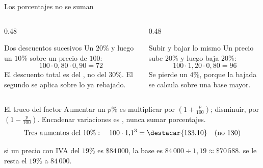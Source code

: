 \documentclass[aspectratio=169,10pt]{beamer}
\begin{document}
\begin{frame}{Los porcentajes no se suman}
  \scriptsize
  \begin{columns}[T,onlytextwidth]
    \begin{column}{0.48\textwidth}
      \begin{alertblock}{Dos descuentos sucesivos}
        \tiny
        Un $20\%$ y luego un $10\%$ sobre un precio de $100$:
        \[ 100\cdot 0{,}80\cdot 0{,}90 = 72 \]
        El descuento total es del , no del $30\%$.
        El segundo se aplica sobre lo ya rebajado.
      \end{alertblock}
    \end{column}
    \begin{column}{0.48\textwidth}
      \begin{alertblock}{Subir y bajar lo mismo}
        \tiny
        Un precio sube $20\%$ y luego baja $20\%$:
        \[ 100\cdot 1{,}20\cdot 0{,}80 = 96 \]
         Se pierde un $4\%$,
        porque la bajada se calcula sobre una base mayor.
      \end{alertblock}
    \end{column}
  \end{columns}

  \vspace{0.12cm}
  \begin{block}{El truco del factor}
    \tiny
    Aumentar un $p\%$ es multiplicar por $\left(1+\tfrac{p}{100}\right)$;
    disminuir, por $\left(1-\tfrac{p}{100}\right)$. Encadenar variaciones es
    , nunca sumar porcentajes.
    \[ \text{Tres aumentos del } 10\%:\quad
       100\cdot 1{,}1^{3} = \destacar{133{,}10} \quad
       \text{(no } 130\text{)} \]
  \end{block}

  \vspace{0.06cm}
  {\tiny\color{uniGris}  si un precio con IVA del
  $19\%$ es $\$84\,000$, la base es $84\,000\div 1{,}19 \approx
  \$70\,588$.  se le resta el $19\%$ a $84\,000$.}
\end{frame}
\end{document}
